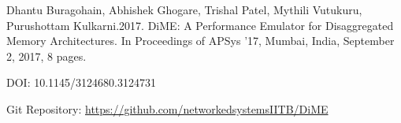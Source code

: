 \listofpublications



Dhantu Buragohain, Abhishek Ghogare, Trishal Patel, Mythili Vutukuru, Purushottam Kulkarni.2017. DiME: A Performance Emulator for Disaggregated Memory Architectures. In Proceedings of APSys '17, Mumbai, India, September 2, 2017, 8 pages.

\noindent DOI: 10.1145/3124680.3124731

\noindent Git Repository: \href{https://github.com/networkedsystemsIITB/DiME}{https://github.com/networkedsystemsIITB/DiME} \cite{dimerepo}














